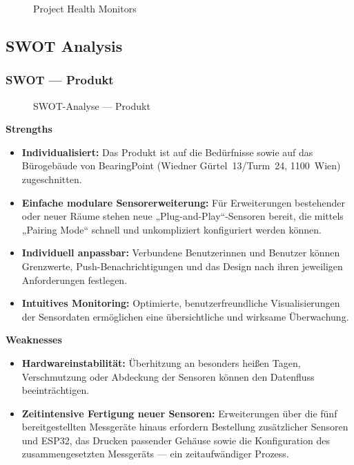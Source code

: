 \documentclass{article}
\begin{document}
\begin{figure}[H]
  \centering
  
  \caption{Project Health Monitors}
  \label{fig:project_health_monitors}
\end{figure}


\subsection{SWOT Analysis}

\subsubsection{SWOT — Produkt}
\begin{figure}[H]
  \centering
  
  \caption{SWOT-Analyse — Produkt}
  \label{fig:swot-produkt}
\end{figure}

\noindent\textbf{Strengths}
\begin{itemize}
  \item \textbf{Individualisiert:} Das Produkt ist auf die Bedürfnisse sowie auf das Bürogebäude von BearingPoint (Wiedner Gürtel~13/Turm~24, 1100~Wien) zugeschnitten.
  \item \textbf{Einfache modulare Sensorerweiterung:} Für Erweiterungen bestehender oder neuer Räume stehen neue „Plug-and-Play“-Sensoren bereit, die mittels „Pairing Mode“ schnell und unkompliziert konfiguriert werden können.
  \item \textbf{Individuell anpassbar:} Verbundene Benutzerinnen und Benutzer können Grenzwerte, Push-Benachrichtigungen und das Design nach ihren jeweiligen Anforderungen festlegen.
  \item \textbf{Intuitives Monitoring:} Optimierte, benutzerfreundliche Visualisierungen der Sensordaten ermöglichen eine übersichtliche und wirksame Überwachung.
\end{itemize}

\noindent\textbf{Weaknesses}
\begin{itemize}
  \item \textbf{Hardwareinstabilität:} Überhitzung an besonders heißen Tagen, Verschmutzung oder Abdeckung der Sensoren können den Datenfluss beeinträchtigen.
  \item \textbf{Zeitintensive Fertigung neuer Sensoren:} Erweiterungen über die fünf bereitgestellten Messgeräte hinaus erfordern Bestellung zusätzlicher Sensoren und ESP32, das Drucken passender Gehäuse sowie die Konfiguration des zusammengesetzten Messgeräts — ein zeitaufwändiger Prozess.
\end{itemize}
\end{document}
